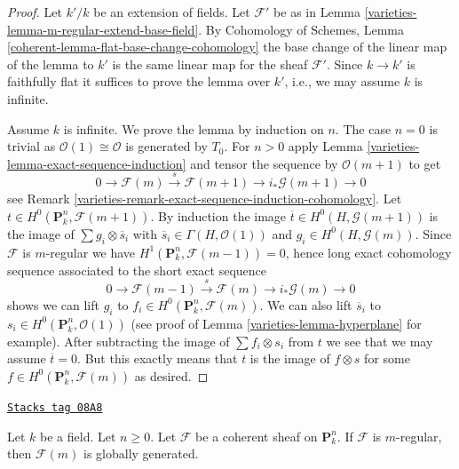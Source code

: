 \begin{proof}

Let $k'/k$ be an extension of fields. Let $\mathcal{F}'$
be as in Lemma \ref{varieties-lemma-m-regular-extend-base-field}. By
Cohomology of Schemes, Lemma \ref{coherent-lemma-flat-base-change-cohomology}
the base change of the linear map of the lemma to $k'$ is the
same linear map for the sheaf $\mathcal{F}'$. Since $k \to k'$
is faithfully flat it suffices to prove the lemma over $k'$, i.e.,
we may assume $k$ is infinite.

\medskip\noindent
Assume $k$ is infinite. We prove the lemma by induction on $n$.
The case $n = 0$ is trivial as $\mathcal{O}(1) \cong \mathcal{O}$
is generated by $T_0$. For $n > 0$ apply
Lemma \ref{varieties-lemma-exact-sequence-induction}
and tensor the sequence by $\mathcal{O}(m + 1)$ to get
$$
0 \to \mathcal{F}(m) \xrightarrow{s} \mathcal{F}(m + 1) \to
i_*\mathcal{G}(m + 1) \to 0
$$
see Remark \ref{varieties-remark-exact-sequence-induction-cohomology}.
Let $t \in H^0(\mathbf{P}^n_k, \mathcal{F}(m + 1))$.
By induction the image $\overline{t} \in H^0(H, \mathcal{G}(m + 1))$
is the image of $\sum g_i \otimes \overline{s}_i$ with
$\overline{s}_i \in \Gamma(H, \mathcal{O}(1))$ and
$g_i \in H^0(H, \mathcal{G}(m))$. Since $\mathcal{F}$ is $m$-regular
we have $H^1(\mathbf{P}^n_k, \mathcal{F}(m - 1)) = 0$, hence long
exact cohomology sequence associated to the short exact sequence
$$
0 \to \mathcal{F}(m - 1) \xrightarrow{s} \mathcal{F}(m) \to
i_*\mathcal{G}(m) \to 0
$$
shows we can lift $g_i$ to $f_i \in H^0(\mathbf{P}^n_k, \mathcal{F}(m))$.
We can also lift $\overline{s}_i$ to
$s_i \in H^0(\mathbf{P}^n_k, \mathcal{O}(1))$ (see proof of
Lemma \ref{varieties-lemma-hyperplane} for example). After subtracting the
image of $\sum f_i \otimes s_i$ from $t$ we see that we may assume
$\overline{t} = 0$. But this exactly means that $t$ is the
image of $f \otimes s$ for some $f \in H^0(\mathbf{P}^n_k, \mathcal{F}(m))$
as desired.
\end{proof}

\begin{lemma}
\label{varieties-lemma-m-regular-globally-generated}
\href{https://stacks.math.columbia.edu/tag/08A8}{\texttt{Stacks tag 08A8}}

Let $k$ be a field. Let $n \geq 0$.
Let $\mathcal{F}$ be a coherent sheaf on $\mathbf{P}^n_k$.
If $\mathcal{F}$ is $m$-regular, then $\mathcal{F}(m)$ is
globally generated.
\end{lemma}

